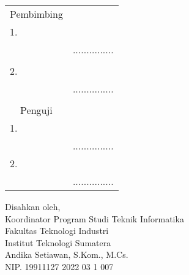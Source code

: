 \begin{center}
	\justify
    \setlength{\tabcolsep}{0pt}
    \begin{tabular}{ m{0.5cm}  m{} >{\centering\arraybackslash}m{}}
        \multicolumn{2}{c}{\hspace*{70pt}Pembimbing} & \multicolumn{1}{c}{} \\[2pt]
		1. & \printnamadosbinga & \\
		 & \printnipdosbinga & ............... \\%
		 & \\
		2. & \printnamadosbinga & \\
		& \printnipdosbinga & ............... \\%
		& \\
		\multicolumn{2}{c}{\hspace*{70pt}Penguji} & \multicolumn{1}{c}{} \\[2pt]
		1. & \printnamapengujia & \\
		& \printnippengujia & ............... \\[4pt]
		2. & \printnamapengujib & \\
		& \printnippengujib & ............... \\
    \end{tabular}

	\begin{center}
		\fontsize{10pt}{10pt}
        \vspace{0.45cm}
		Disahkan oleh,\\
		Koordinator Program Studi Teknik Informatika\\
		Fakultas Teknologi Industri\\
		Institut Teknologi Sumatera
		\vspace{1.8cm}\\
		Andika Setiawan, S.Kom., M.Cs. \\ %
		NIP. 19911127 2022 03 1 007 \\
	\end{center}
	\vfill

\end{center}
\clearpage